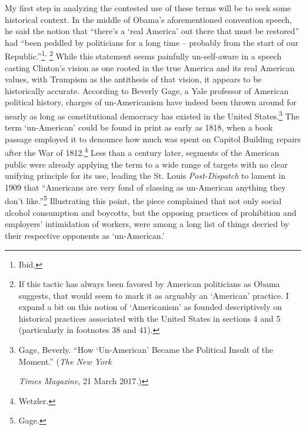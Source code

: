 My first step in analyzing the contested use of these terms will be to
seek some historical context. In the middle of Obama's aforementioned
convention speech, he said the notion that ``there's a `real America'
out there that must be restored'' had ``been peddled by politicians for
a long time -- probably from the start of our Republic.''\footnote{Ibid.}\textsuperscript{,}
\footnote{If this tactic has always been favored by American politicians
  as Obama suggests, that would seem to mark it as arguably an
  `American' practice. I expand a bit on this notion of `Americanism' as
  founded descriptively on historical practices associated with the
  United States in sections 4 and 5 (particularly in footnotes 38 and
  41).} While this statement seems painfully un-self-aware in a speech
casting Clinton's vision as one rooted in the true America and its real
American values, with Trumpism as the antithesis of that vision, it
appears to be historically accurate. According to Beverly Gage, a Yale
professor of American political history, charges of un-Americanism have
indeed been thrown around for nearly as long as constitutional democracy
has existed in the United States.\footnote{Gage, Beverly. ``How
  `Un-American' Became the Political Insult of the Moment.'' (\emph{The
  New York}

  \emph{Times Magazine}, 21 March 2017.)}
The term `un-American' could be found in print as early as 1818, when a
book passage employed it to denounce how much was spent on Capitol
Building repairs after the War of 1812.\footnote{Wetzler.} Less than a
century later, segments of the American public were already applying the
term to a wide range of targets with no clear unifying principle for its
use, leading the St. Louis \emph{Post-Dispatch} to lament in 1909 that
``Americans are very fond of classing as un-American anything they don't
like.''\footnote{Gage.} Illustrating this point, the piece complained
that not only social alcohol consumption and boycotts, but the opposing
practices of prohibition and employers' intimidation of workers, were
among a long list of things decried by their respective opponents as
`un-American.'

